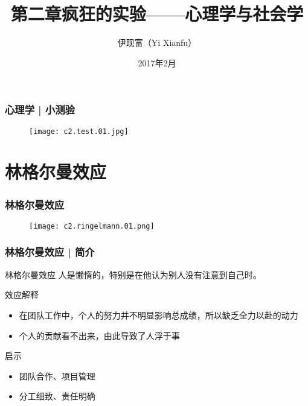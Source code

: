 



\title[心理学与社会学]{第二章\quad 疯狂的实验——心理学与社会学}
\author[Yixf]{伊现富（Yi Xianfu）}
\date{2017年2月}



\begin{frame}
  \frametitle{心理学 | 小测验}
  \begin{figure}
    \centering
    \texttt{[image: c2.test.01.jpg]}
  \end{figure}
\end{frame}

\section{林格尔曼效应}
\begin{frame}
  \frametitle{林格尔曼效应}
  \begin{figure}
    \centering
    \texttt{[image: c2.ringelmann.01.png]}
  \end{figure}
\end{frame}

\begin{frame}
  \frametitle{林格尔曼效应 | 简介}
  \begin{block}{林格尔曼效应}
    人是懒惰的，特别是在他认为别人没有注意到自己时。
  \end{block}
  \pause
  \begin{block}{效应解释}
    \begin{itemize}
      \item 在团队工作中，个人的努力并不明显影响总成绩，所以缺乏全力以赴的动力
      \item 个人的贡献看不出来，由此导致了人浮于事
    \end{itemize}
  \end{block}
  \pause
  \begin{block}{启示}
    \begin{itemize}
      \item 团队合作、项目管理
      \item 分工细致、责任明确
    \end{itemize}
  \end{block}
\end{frame}

